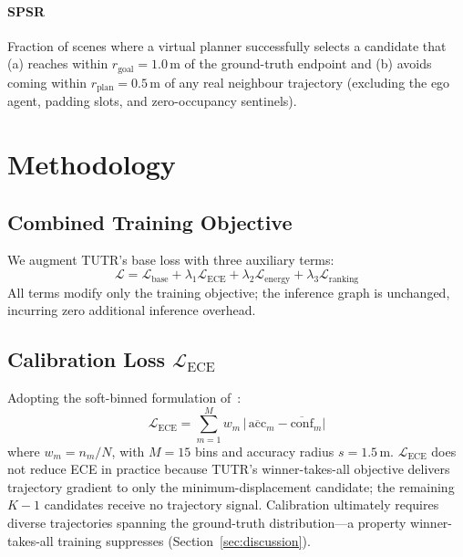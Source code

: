 \documentclass[journal]{IEEEtran}
\begin{document}
\paragraph{SPSR} Fraction of scenes where a virtual planner
successfully selects a candidate that (a) reaches within
$r_\text{goal}{=}1.0$\,m of the ground-truth endpoint and (b) avoids
coming within $r_\text{plan}{=}0.5$\,m of any real neighbour
trajectory (excluding the ego agent, padding slots, and zero-occupancy
sentinels).

\section{Methodology}
\label{sec:method}

\subsection{Combined Training Objective}

We augment TUTR's base loss with three auxiliary terms:
\begin{equation}
  \mathcal{L} = \mathcal{L}_{\text{base}} +
                \lambda_1\mathcal{L}_{\text{ECE}} +
                \lambda_2\mathcal{L}_{\text{energy}} +
                \lambda_3\mathcal{L}_{\text{ranking}}
  \label{eq:combined}
\end{equation}
All terms modify only the training objective; the inference graph is
unchanged, incurring zero additional inference overhead.

\subsection{Calibration Loss $\mathcal{L}_{\text{ECE}}$}

Adopting the soft-binned formulation of~\cite{karandikar2021soft}:
\begin{equation}
  \mathcal{L}_{\text{ECE}} = \sum_{m=1}^{M} w_m\,
  \bigl|\,\overline{\mathrm{acc}}_m - \overline{\mathrm{conf}}_m\bigr|
  \label{eq:lece}
\end{equation}
where $w_m=n_m/N$, with $M{=}15$ bins and accuracy radius
$s{=}1.5$\,m.
$\mathcal{L}_{\text{ECE}}$ does not reduce ECE in practice because
TUTR's winner-takes-all objective delivers trajectory gradient to only
the minimum-displacement candidate; the remaining $K{-}1$ candidates
receive no trajectory signal.
Calibration ultimately requires diverse trajectories spanning the
ground-truth distribution---a property winner-takes-all training
suppresses (Section~\ref{sec:discussion}).
\end{document}
